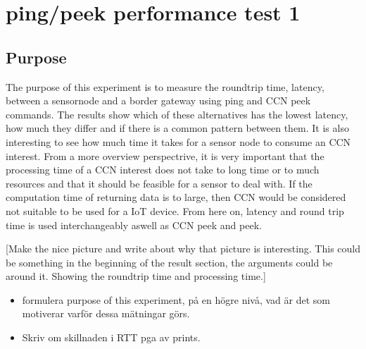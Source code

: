 
\section{ping/peek performance test 1}
\subsection{Purpose}
The purpose of this experiment is to measure the roundtrip time, latency, between a sensornode and a border gateway using ping and CCN peek commands. The results show which of these alternatives has the lowest latency, how much they differ and if there is a common pattern between them. It is also interesting to see how much time it takes for a sensor node to consume an CCN interest. From a more overview perspectrive, it is very important that the processing time of a CCN interest does not take to long time or to much resources and that it should be feasible for a sensor to deal with. If the computation time of returning data is to large, then CCN would be considered not suitable to be used for a IoT device. From here on, latency and round trip time is used interchangeably aswell as CCN peek and peek.

[Make the nice picture and write about why that picture is interesting. This could be something in the beginning of the result section, the arguments could be around it. Showing the roundtrip time and processing time.]

\begin{itemize}
    \item formulera purpose of this experiment, på en högre nivå, vad är det som motiverar varför dessa mätningar görs.
    \item Skriv om skillnaden i RTT pga av prints.

\end{itemize}

